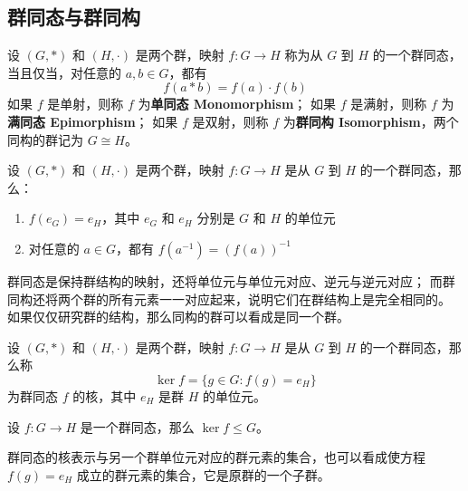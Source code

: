 \subsection{群同态与群同构}
\begin{definition}
    设 $(G, *)$ 和 $(H, \cdot)$ 是两个群，映射 $f: G \to H$ 称为从 $G$ 到 $H$ 的一个群同态，当且仅当，对任意的 $a, b\in G$，都有
    \[
        f(a * b) = f(a) \cdot f(b)
    \]
    如果 $f$ 是单射，则称 $f$ 为\textbf{单同态 Monomorphism}；
    如果 $f$ 是满射，则称 $f$ 为\textbf{满同态 Epimorphism}；
    如果 $f$ 是双射，则称 $f$ 为\textbf{群同构 Isomorphism}，两个同构的群记为 $G \cong H$。
    \label{def:group_homomorphism}
\end{definition}

\begin{proposition}[群同态的性质]
    设 $(G, *)$ 和 $(H, \cdot)$ 是两个群，映射 $f: G \to H$ 是从 $G$ 到 $H$ 的一个群同态，那么：
    \begin{enumerate}
        \item $f(e_G) = e_H$，其中 $e_G$ 和 $e_H$ 分别是 $G$ 和 $H$ 的单位元
        \item 对任意的 $a\in G$，都有 $f(a^{-1}) = (f(a))^{-1}$
    \end{enumerate}
\end{proposition}

\begin{note}
    群同态是保持群结构的映射，还将单位元与单位元对应、逆元与逆元对应；
    而群同构还将两个群的所有元素一一对应起来，说明它们在群结构上是完全相同的。
    如果仅仅研究群的结构，那么同构的群可以看成是同一个群。
\end{note}
\vspace{1em}

\begin{definition}
    设 $(G, *)$ 和 $(H, \cdot)$ 是两个群，映射 $f: G \to H$ 是从 $G$ 到 $H$ 的一个群同态，那么称
    \[
        \ker f = \{g\in G : f(g) = e_H\}
    \]
    为群同态 $f$ 的核，其中 $e_H$ 是群 $H$ 的单位元。
\end{definition}

\begin{proposition}
    设 $f:G\to H$ 是一个群同态，那么 $\ker f \le G$。
\end{proposition}

\begin{note}
    群同态的核表示与另一个群单位元对应的群元素的集合，也可以看成使方程 $f(g) = e_H$ 成立的群元素的集合，它是原群的一个子群。
\end{note}
\vspace{1em}

